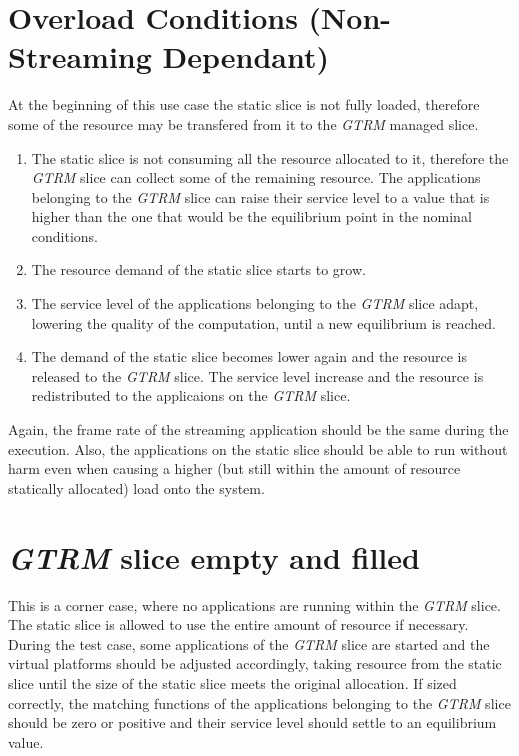 \documentclass[nobiblatex]{LTHthesis}
\begin{document}
\section{Overload Conditions (Non-Streaming Dependant)}

At the beginning of this use case the static slice is not fully loaded,
therefore some of the resource may be transfered from it to the \emph{GTRM}
managed slice.

\begin{enumerate}
\item The static slice is not consuming all the resource allocated to it,
  therefore the \emph{GTRM} slice can collect some of the remaining resource. The
  applications belonging to the \emph{GTRM} slice can raise their service level to
  a value that is higher than the one that would be the equilibrium point
  in the nominal conditions.
\item The resource demand of the static slice starts to grow.
\item The service level of the applications belonging to the \emph{GTRM} slice
  adapt, lowering the quality of the computation, until a new equilibrium
  is reached.
\item The demand of the static slice becomes lower again and the resource
  is released to the \emph{GTRM} slice. The service level increase and the resource
  is redistributed to the applicaions on the \emph{GTRM} slice.
\end{enumerate}

Again, the frame rate of the streaming application should be the same
during the execution. Also, the applications on the static slice should be
able to run without harm even when causing a higher (but still within the
amount of resource statically allocated) load onto the system.

\section{\emph{GTRM} slice empty and filled}

This is a corner case, where no applications are running within the \emph{GTRM}
slice. The static slice is allowed to use the entire amount of resource if
necessary. During the test case, some applications of the \emph{GTRM} slice are
started and the virtual platforms should be adjusted accordingly, taking
resource from the static slice until the size of the static slice meets
the original allocation. If sized correctly, the matching functions of the
applications belonging to the \emph{GTRM} slice should be zero or positive and
their service level should settle to an equilibrium value.
\end{document}
